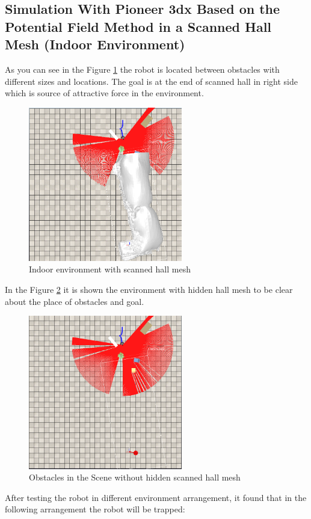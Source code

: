\subsection{Simulation With Pioneer 3dx Based on the Potential Field Method in a Scanned Hall Mesh (Indoor Environment) }
\noindent As you can see in the Figure \ref{fig:Indoor environment with scanned hall mesh} the robot is located between obstacles with different sizes and locations. The goal is at the end of scanned hall in right side which is source of attractive force in the environment.   
\begin{figure}[H]
  \centering
  \includegraphics[width= 0.6\textwidth]{Figures/1.PNG}
  \caption[Indoor environment with scanned hall mesh]{Indoor environment with scanned hall mesh} 
   \label{fig:Indoor environment with scanned hall mesh}
\end{figure}

\noindent In the Figure \ref{fig:Obstacles in the scene without hidden scanned hall mesh} it is shown the environment with hidden hall mesh to be clear about the place of obstacles and goal.  

\begin{figure}[H]
  \centering
  \includegraphics[width= 0.6\textwidth]{Figures/2.PNG}
  \caption[Obstacles in the scene without hidden scanned hall mesh]{Obstacles in the Scene without hidden scanned hall mesh}
   \label{fig:Obstacles in the scene without hidden scanned hall mesh}
\end{figure}
After testing the robot in different environment arrangement, it found that in the following arrangement the robot will be trapped: 


